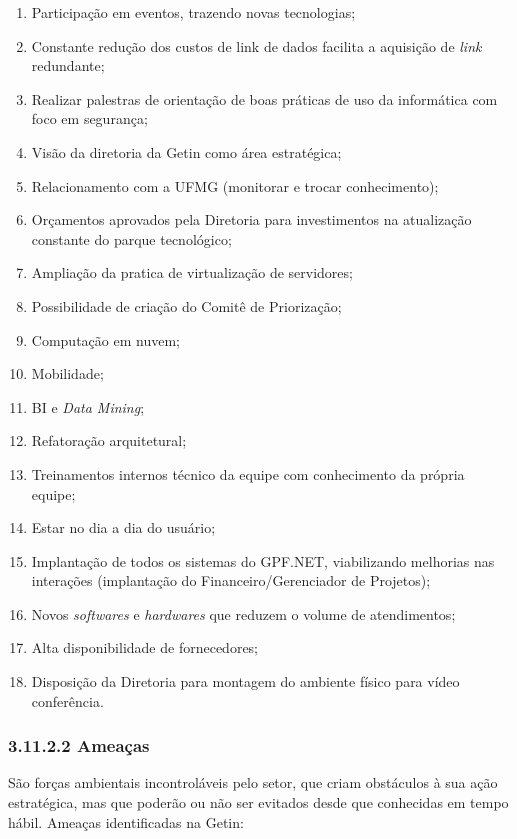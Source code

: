 \documentclass{article}
\begin{document}
\begin{enumerate}
    \item Participação em eventos, trazendo novas tecnologias;
    \item Constante redução dos custos de link de dados facilita a aquisição de \textit{link} redundante;
    \item Realizar palestras de orientação de boas práticas de uso da informática com foco em segurança;
    \item Visão da diretoria da Getin como área estratégica;
    \item Relacionamento com a UFMG (monitorar e trocar conhecimento);
    \item Orçamentos aprovados pela Diretoria para investimentos na atualização constante do parque tecnológico;
    \item Ampliação da pratica de virtualização de servidores;
    \item Possibilidade de criação do Comitê de Priorização;
    \item Computação em nuvem;
    \item Mobilidade;
    \item BI e \textit{Data Mining};
    \item Refatoração arquitetural;
    \item Treinamentos internos técnico da equipe com conhecimento da própria equipe;
    \item Estar no dia a dia do usuário;
    \item Implantação de todos os sistemas do GPF.NET, viabilizando melhorias nas interações (implantação do Financeiro/Gerenciador de Projetos);
    \item Novos \textit{softwares} e \textit{hardwares} que reduzem o volume de atendimentos;
    \item Alta disponibilidade de fornecedores;
    \item Disposição da Diretoria para montagem do ambiente físico para vídeo conferência.
\end{enumerate}

\subsubsection*{3.11.2.2 Ameaças}

São forças ambientais incontroláveis pelo setor, que criam obstáculos à sua ação estratégica, mas que poderão ou não ser evitados desde que conhecidas em tempo hábil.
Ameaças identificadas na Getin:
\end{document}
